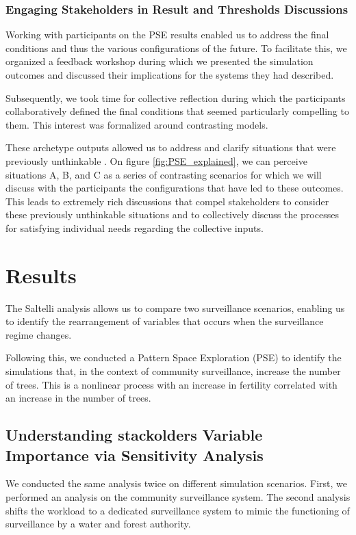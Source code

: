 \documentclass{article}
\begin{document}
    \subsubsection{Engaging Stakeholders in Result and Thresholds Discussions}

    Working with participants on the PSE results enabled us to address the final conditions and thus the various configurations of the future. To facilitate this, we organized a feedback workshop during which we presented the simulation outcomes and discussed their implications for the systems they had described.

    Subsequently, we took time for collective reflection during which the participants collaboratively defined the final conditions that seemed particularly compelling to them. This interest was formalized around contrasting models.

    These archetype outputs allowed us to address and clarify situations that were previously unthinkable \parencite{banos_simulation_2010}. On figure \ref{fig:PSE_explained}, we can perceive situations A, B, and C as a series of contrasting scenarios for which we will discuss with the participants the configurations that have led to these outcomes. This leads to extremely rich discussions that compel stakeholders to consider these previously unthinkable situations and to collectively discuss the processes for satisfying individual needs regarding the collective inputs.


\section{Results}

The Saltelli analysis allows us to compare two surveillance scenarios, enabling us to identify the rearrangement of variables that occurs when the surveillance regime changes.

Following this, we conducted a Pattern Space Exploration (PSE) to identify the simulations that, in the context of community surveillance, increase the number of trees. This is a nonlinear process with an increase in fertility correlated with an increase in the number of trees.


    \subsection{Understanding stackolders Variable Importance via Sensitivity Analysis}

    We conducted the same analysis twice on different simulation scenarios. First, we performed an analysis on the community surveillance system. The second analysis shifts the workload to a dedicated surveillance system to mimic the functioning of surveillance by a water and forest authority.
\end{document}
